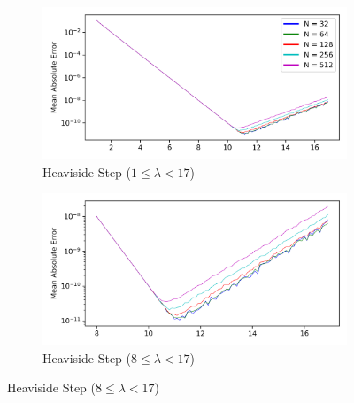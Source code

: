 \documentclass[a4paper]{report}
\begin{document}
\begin{figure}[H]
    \begin{subfigure}{.45\linewidth}
      \includegraphics[width=\linewidth]{images/abate_whitt/heaviside.png}
      \caption{Heaviside Step ($1 \leq \lambda < 17$)}
    \end{subfigure}\hfill
    \begin{subfigure}{.45\linewidth}
      \includegraphics[width=\linewidth]{images/abate_whitt/heaviside_zoomed.png}
      \caption{Heaviside Step ($8 \leq \lambda < 17$)}
    \end{subfigure}
    
    \medskip
    

\end{figure}
\end{document}
